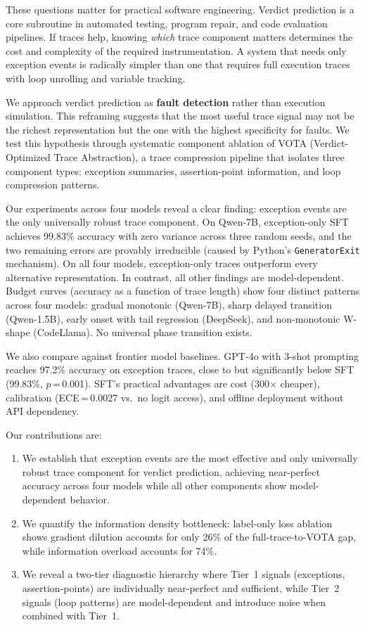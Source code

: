 \documentclass[11pt]{article}
\begin{document}
These questions matter for practical software engineering. Verdict prediction is a core subroutine in automated testing, program repair, and code evaluation pipelines. If traces help, knowing \emph{which} trace component matters determines the cost and complexity of the required instrumentation. A system that needs only exception events is radically simpler than one that requires full execution traces with loop unrolling and variable tracking.

We approach verdict prediction as \textbf{fault detection} rather than execution simulation. This reframing suggests that the most useful trace signal may not be the richest representation but the one with the highest specificity for faults. We test this hypothesis through systematic component ablation of VOTA (Verdict-Optimized Trace Abstraction), a trace compression pipeline that isolates three component types: exception summaries, assertion-point information, and loop compression patterns.

Our experiments across four models reveal a clear finding: exception events are the only universally robust trace component. On Qwen-7B, exception-only SFT achieves 99.83\% accuracy with zero variance across three random seeds, and the two remaining errors are provably irreducible (caused by Python's \texttt{GeneratorExit} mechanism). On all four models, exception-only traces outperform every alternative representation. In contrast, all other findings are model-dependent. Budget curves (accuracy as a function of trace length) show four distinct patterns across four models: gradual monotonic (Qwen-7B), sharp delayed transition (Qwen-1.5B), early onset with tail regression (DeepSeek), and non-monotonic W-shape (CodeLlama). No universal phase transition exists.

We also compare against frontier model baselines. GPT-4o with 3-shot prompting reaches 97.2\% accuracy on exception traces, close to but significantly below SFT (99.83\%, $p$\,=\,0.001). SFT's practical advantages are cost (300$\times$ cheaper), calibration (ECE\,=\,0.0027 vs.\ no logit access), and offline deployment without API dependency.

Our contributions are:
\begin{enumerate}[leftmargin=*,nosep]
    \item We establish that exception events are the most effective and only universally robust trace component for verdict prediction, achieving near-perfect accuracy across four models while all other components show model-dependent behavior.
    \item We quantify the information density bottleneck: label-only loss ablation shows gradient dilution accounts for only 26\% of the full-trace-to-VOTA gap, while information overload accounts for 74\%.
    \item We reveal a two-tier diagnostic hierarchy where Tier~1 signals (exceptions, assertion-points) are individually near-perfect and sufficient, while Tier~2 signals (loop patterns) are model-dependent and introduce noise when combined with Tier~1.
\end{enumerate}
\end{document}
